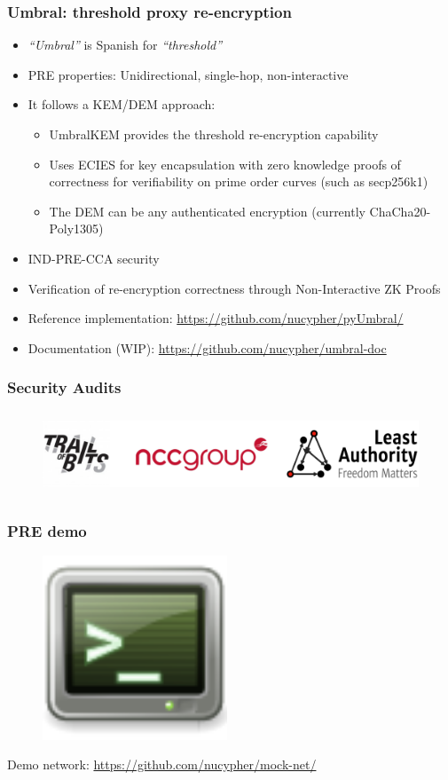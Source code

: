 \documentclass[xetex,mathsans,sans,aspectratio=169]{beamer}
\begin{document}
    \begin{frame}
        \frametitle{Umbral: threshold proxy re-encryption}
        \begin{itemize}
        	\item \emph{``Umbral''} is Spanish for \emph{``threshold''}
            \item PRE properties: Unidirectional, single-hop, non-interactive
            \item It follows a KEM/DEM approach:
            	\begin{itemize}
					\item UmbralKEM provides the threshold re-encryption capability
                    \item Uses ECIES for key encapsulation with zero knowledge proofs of correctness for verifiability on prime order curves (such as secp256k1)
            		\item The DEM can be any authenticated encryption (currently ChaCha20-Poly1305)
        		\end{itemize}
			\item IND-PRE-CCA security
			\item Verification of re-encryption correctness through Non-Interactive ZK Proofs
			\item Reference implementation: \url{https://github.com/nucypher/pyUmbral/}
			\item Documentation (WIP): \url{https://github.com/nucypher/umbral-doc}
        \end{itemize}
    \end{frame}

    \begin{frame}
        \frametitle{Security Audits}
        \begin{figure}
            \centering
            \includegraphics[height=2.5cm]{pdf/security-audits.pdf}
      \end{figure}
    \end{frame}

    \begin{frame}
        \frametitle{PRE demo}
        \begin{figure}
            \centering
            \includegraphics[height=5.5cm]{pdf/terminal.pdf}
        \end{figure}
        Demo network: \url{https://github.com/nucypher/mock-net/}
    \end{frame}
\end{document}
